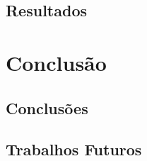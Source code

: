 \documentclass[
	12pt,				%
	openright,			%
	oneside,			%
	a4paper,			%
	english,			%
	brazil				%
	]{abntex2}
\begin{document}
		\section{Resultados}
		

  \chapter{Conclusão}

		\section{Conclusões}

		\section{Trabalhos Futuros}


\postextual



\printindex
\end{document}
